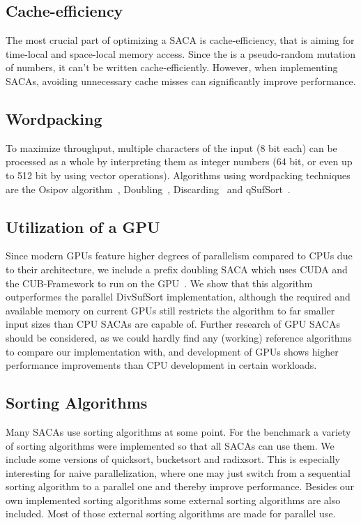 \subsection{Cache-efficiency}

The most crucial part of optimizing a SACA is cache-efficiency, that is aiming for time-local and space-local memory access.
Since the \sa is a pseudo-random mutation of numbers, it can't be written cache-efficiently.
However, when implementing SACAs, avoiding unnecessary cache misses can significantly improve performance.

\subsection{Wordpacking}

To maximize throughput, multiple characters of the input (8 bit each) can be processed as a whole by
interpreting them as integer numbers (64 bit, or even up to 512 bit by using vector operations).
Algorithms using wordpacking techniques are the Osipov algorithm~\cite{osipovGPU},
Doubling~\cite{saca:11}, Discarding~\cite{saca:11} and qSufSort~\cite{saca:1}.

\subsection{Utilization of a GPU}

Since modern GPUs feature higher degrees of parallelism compared to CPUs due to their architecture,
we include a prefix doubling SACA which uses CUDA and the CUB-Framework to run on the GPU~\cite{osipovGPU}.
We show that this algorithm outperformes the parallel DivSufSort implementation,
although the required and available memory on current GPUs still restricts the algorithm to far smaller input sizes than CPU SACAs are capable of.
Further research of GPU SACAs should be considered,
as we could hardly find any (working) reference algorithms to compare our implementation with, 
and development of GPUs shows higher performance improvements than CPU development in certain workloads.

\subsection{Sorting Algorithms}

Many SACAs use sorting algorithms at some point. For the benchmark a variety of sorting algorithms were implemented so that all SACAs can use them.
We include some versions of quicksort, bucketsort and radixsort.
This is especially interesting for naive parallelization, where one may just switch from a sequential sorting algorithm to a parallel one
and thereby improve performance.
Besides our own implemented sorting algorithms some external sorting algorithms are also included.
Most of those external sorting algorithms are made for parallel use.

